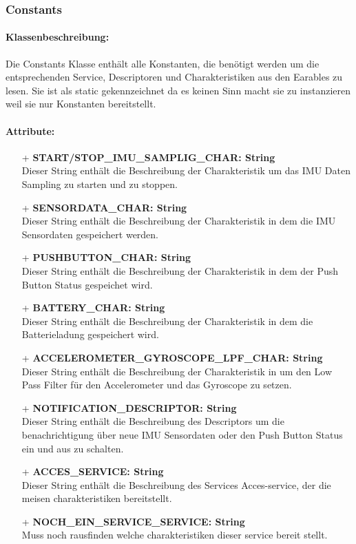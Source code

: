 \documentclass[a4paper,12pt]{article}
\begin{document}
\subsubsection{Constants}
\paragraph{Klassenbeschreibung:}
Die Constants Klasse enthält alle Konstanten, die benötigt werden um die entsprechenden Service, Descriptoren und Charakteristiken aus den Earables zu lesen. Sie ist als static gekennzeichnet da es keinen Sinn macht sie zu instanzieren weil sie nur Konstanten bereitstellt.

\paragraph{Attribute:}
\begin{itemize}
	\item[+] \textbf{START/STOP\_IMU\_SAMPLIG\_CHAR: String}\\Dieser String enthält die Beschreibung der Charakteristik um das IMU Daten Sampling zu starten und zu stoppen.
	\item[+] \textbf{SENSORDATA\_CHAR: String}\\Dieser String enthält die Beschreibung der Charakteristik in dem die IMU Sensordaten gespeichert werden.
	\item[+] \textbf{PUSHBUTTON\_CHAR: String}\\Dieser String enthält die Beschreibung der Charakteristik in dem der Push Button Status gespeichet wird.
	\item[+] \textbf{BATTERY\_CHAR: String}\\Dieser String enthält die Beschreibung der Charakteristik in dem die Batterieladung gespeichert wird.
	\item[+] \textbf{ACCELEROMETER\_GYROSCOPE\_LPF\_CHAR: String}\\Dieser String enthält die Beschreibung der Charakteristik in um den Low Pass Filter für den Accelerometer und das Gyroscope zu setzen.
	\item[+] \textbf{NOTIFICATION\_DESCRIPTOR: String}\\Dieser String enthält die Beschreibung des Descriptors um die benachrichtigung über neue IMU Sensordaten oder den Push Button Status ein und aus zu schalten.
\item[+] \textbf{ACCES\_SERVICE: String}\\Dieser String enthält die Beschreibung des Services Acces-service, der die meisen charakteristiken bereitstellt.
\item[+] \textbf{NOCH\_EIN\_SERVICE\_SERVICE: String}\\Muss noch rausfinden welche charakteristiken dieser service bereit stellt.
\end{itemize}
\end{document}
